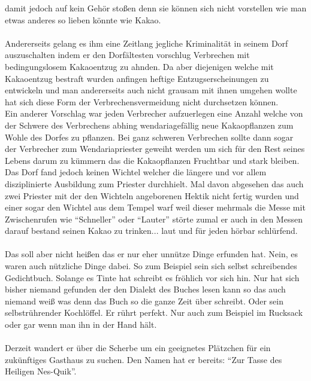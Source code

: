 \documentclass[10pt, a4paper]{proc}
\begin{document}
damit jedoch auf kein Geh{\"o}r sto{\ss}en denn sie k{\"o}nnen sich nicht
vorstellen wie man etwas anderes so lieben k{\"o}nnte wie
Kakao.\\\\Andererseits gelang es ihm eine Zeitlang jegliche
Kriminalit{\"a}t in seinem Dorf auszuschalten indem er den
Dorf{\"a}ltesten vorschlug Verbrechen mit bedingungslosem Kakaoentzug
zu ahnden. Da aber diejenigen welche mit Kakaoentzug bestraft
wurden anfingen heftige Entzugserscheinungen zu entwickeln und man
andererseits auch nicht grausam mit ihnen umgehen wollte hat sich
diese Form der Verbrechensvermeidung nicht durchsetzen
k{\"o}nnen.\\Ein anderer Vorschlag war jeden Verbrecher aufzuerlegen
eine Anzahl welche von der Schwere des Verbrechens abhing
wendariagef{\"a}llig neue Kakaopflanzen zum Wohle des Dorfes zu
pflanzen. Bei ganz schweren Verbrechen sollte dann sogar der
Verbrecher zum Wendariapriester geweiht werden um sich f{\"u}r den
Rest seines Lebens darum zu k{\"u}mmern das die Kakaopflanzen
Fruchtbar und stark bleiben. Das Dorf fand jedoch keinen Wichtel
welcher die l{\"a}ngere und vor allem disziplinierte Ausbildung zum
Priester durchhielt. Mal davon abgesehen das auch zwei Priester
mit der den Wichteln angeborenen Hektik nicht fertig wurden und
einer sogar den Wichtel aus dem Tempel warf weil dieser mehrmals
die Messe mit Zwischenrufen wie "`Schneller"' oder "`Lauter"'
st{\"o}rte zumal er auch in den Messen darauf bestand seinen Kakao zu
trinken... laut und f{\"u}r jeden h{\"o}rbar schl{\"u}rfend.\\\\Das soll aber
nicht hei{\ss}en das er nur eher unn{\"u}tze Dinge erfunden hat. Nein, es
waren auch n{\"u}tzliche Dinge dabei. So zum Beispiel sein sich selbst
schreibendes Gedichtbuch. Solange es Tinte hat schreibt es
fr{\"o}hlich vor sich hin. Nur hat sich bisher niemand gefunden der
den Dialekt des Buches lesen kann so das auch niemand wei{\ss} was
denn das Buch so die ganze Zeit {\"u}ber schreibt. Oder sein
selbstr{\"u}hrender Kochl{\"o}ffel. Er r{\"u}hrt perfekt. Nur auch zum
Beispiel im Rucksack oder gar wenn man ihn in der Hand
h{\"a}lt.\\\\Derzeit wandert er {\"u}ber die Scherbe um ein geeignetes
Pl{\"a}tzchen f{\"u}r ein zuk{\"u}nftiges Gasthaus zu suchen. Den Namen hat er
bereits: "`Zur Tasse des Heiligen Nes-Quik"'.
\end{document}
